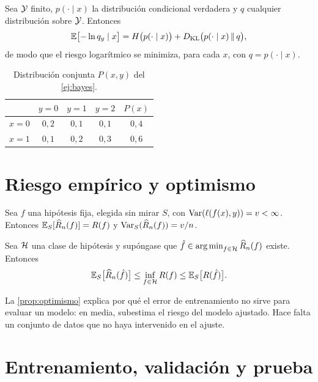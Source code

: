 \begin{proposicion}\label{prop:logloss}
Sea $\mathcal{Y}$ finito, $p(\cdot\mid x)$ la distribución condicional verdadera y $q$ cualquier distribución sobre $\mathcal{Y}$. Entonces
\[
\mathbb{E}\bigl[-\ln q_y\mid x\bigr]=H\bigl(p(\cdot\mid x)\bigr)+D_{\mathrm{KL}}\bigl(p(\cdot\mid x)\,\Vert\,q\bigr),
\]
de modo que el riesgo logarítmico se minimiza, para cada $x$, con $q=p(\cdot\mid x)$.
\end{proposicion}

\addtocounter{definicion}{1}%

\addtocounter{definicion}{1}%

\begin{table}[h]
\centering\small
\caption{Distribución conjunta $P(x,y)$ del \cref{ej:bayes}.}\label{tab:conjunta}
\begin{tabular}{@{}lccc|c@{}}
\toprule
 & $y=0$ & $y=1$ & $y=2$ & $P(x)$ \\
\midrule
$x=0$ & $0{,}2$ & $0{,}1$ & $0{,}1$ & $0{,}4$ \\
$x=1$ & $0{,}1$ & $0{,}2$ & $0{,}3$ & $0{,}6$ \\
\bottomrule
\end{tabular}
\end{table}

\section{Riesgo empírico y optimismo}

\begin{proposicion}\label{prop:insesgado}
Sea $f$ una hipótesis fija, elegida sin mirar $S$, con $\operatorname{Var}(\ell(f(x),y))=v<\infty$. Entonces $\mathbb{E}_S[\widehat{R}_n(f)]=R(f)$ y $\operatorname{Var}_S(\widehat{R}_n(f))=v/n$.
\end{proposicion}

\begin{proposicion}\label{prop:optimismo}
Sea $\mathcal{H}$ una clase de hipótesis y supóngase que $\hat f\in\operatorname*{arg\,min}_{f\in\mathcal{H}}\widehat{R}_n(f)$ existe. Entonces
\[
\mathbb{E}_S\bigl[\widehat{R}_n(\hat f)\bigr]\le\inf_{f\in\mathcal{H}}R(f)\le\mathbb{E}_S\bigl[R(\hat f)\bigr].
\]
\end{proposicion}

La \cref{prop:optimismo} explica por qué el error de entrenamiento no sirve para evaluar un modelo: en media, subestima el riesgo del modelo ajustado. Hace falta un conjunto de datos que no haya intervenido en el ajuste.

\section{Entrenamiento, validación y prueba}

